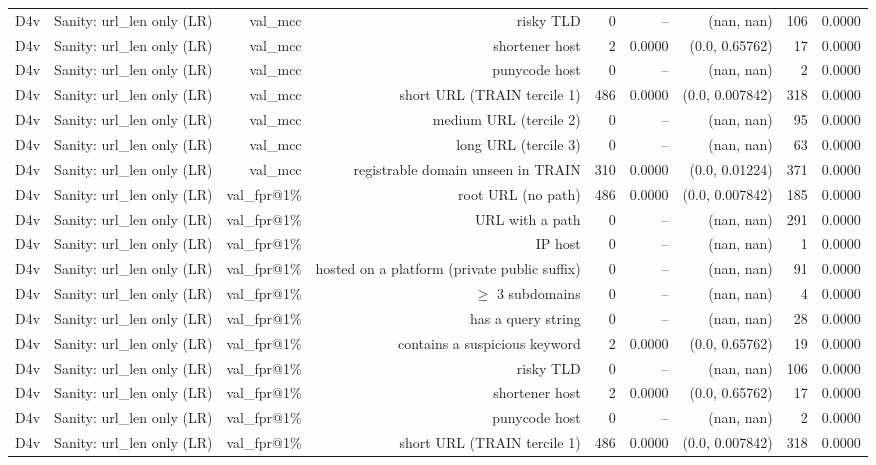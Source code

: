 \begin{table}[t]
\begin{tabular}{llrrrrrrr}
D4v & Sanity: url\_len only (LR) & val\_mcc & risky TLD & 0 & -- & (nan, nan) & 106 & 0.0000 \\
D4v & Sanity: url\_len only (LR) & val\_mcc & shortener host & 2 & 0.0000 & (0.0, 0.65762) & 17 & 0.0000 \\
D4v & Sanity: url\_len only (LR) & val\_mcc & punycode host & 0 & -- & (nan, nan) & 2 & 0.0000 \\
D4v & Sanity: url\_len only (LR) & val\_mcc & short URL (TRAIN tercile 1) & 486 & 0.0000 & (0.0, 0.007842) & 318 & 0.0000 \\
D4v & Sanity: url\_len only (LR) & val\_mcc & medium URL (tercile 2) & 0 & -- & (nan, nan) & 95 & 0.0000 \\
D4v & Sanity: url\_len only (LR) & val\_mcc & long URL (tercile 3) & 0 & -- & (nan, nan) & 63 & 0.0000 \\
D4v & Sanity: url\_len only (LR) & val\_mcc & registrable domain unseen in TRAIN & 310 & 0.0000 & (0.0, 0.01224) & 371 & 0.0000 \\
D4v & Sanity: url\_len only (LR) & val\_fpr@1\% & root URL (no path) & 486 & 0.0000 & (0.0, 0.007842) & 185 & 0.0000 \\
D4v & Sanity: url\_len only (LR) & val\_fpr@1\% & URL with a path & 0 & -- & (nan, nan) & 291 & 0.0000 \\
D4v & Sanity: url\_len only (LR) & val\_fpr@1\% & IP host & 0 & -- & (nan, nan) & 1 & 0.0000 \\
D4v & Sanity: url\_len only (LR) & val\_fpr@1\% & hosted on a platform (private public suffix) & 0 & -- & (nan, nan) & 91 & 0.0000 \\
D4v & Sanity: url\_len only (LR) & val\_fpr@1\% & $\geq$ 3 subdomains & 0 & -- & (nan, nan) & 4 & 0.0000 \\
D4v & Sanity: url\_len only (LR) & val\_fpr@1\% & has a query string & 0 & -- & (nan, nan) & 28 & 0.0000 \\
D4v & Sanity: url\_len only (LR) & val\_fpr@1\% & contains a suspicious keyword & 2 & 0.0000 & (0.0, 0.65762) & 19 & 0.0000 \\
D4v & Sanity: url\_len only (LR) & val\_fpr@1\% & risky TLD & 0 & -- & (nan, nan) & 106 & 0.0000 \\
D4v & Sanity: url\_len only (LR) & val\_fpr@1\% & shortener host & 2 & 0.0000 & (0.0, 0.65762) & 17 & 0.0000 \\
D4v & Sanity: url\_len only (LR) & val\_fpr@1\% & punycode host & 0 & -- & (nan, nan) & 2 & 0.0000 \\
D4v & Sanity: url\_len only (LR) & val\_fpr@1\% & short URL (TRAIN tercile 1) & 486 & 0.0000 & (0.0, 0.007842) & 318 & 0.0000 \\

\end{tabular}
\end{table}
